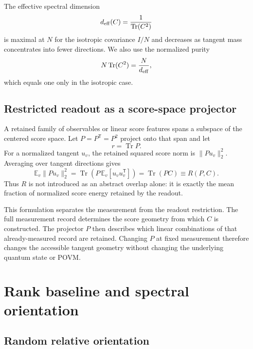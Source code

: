 \documentclass[aps,pra,reprint,superscriptaddress,nofootinbib,longbibliography]{revtex4-2}
\newcommand{\Tr}{\operatorname{Tr}}
\newcommand{\deff}{d_{\rm eff}}
\begin{document}
The effective spectral dimension
\begin{equation}
\deff(C)=\frac{1}{\Tr(C^2)}
\label{eq:deff}
\end{equation}
is maximal at $N$ for the isotropic covariance $I/N$ and decreases as tangent mass concentrates into fewer directions. We also use the normalized purity
\begin{equation}
N\Tr(C^2)=\frac{N}{\deff},
\label{eq:purity}
\end{equation}
which equals one only in the isotropic case.

\subsection{Restricted readout as a score-space projector}

A retained family of observables or linear score features spans a subspace of the centered score space. Let $P=P^{\mathsf T}=P^2$ project onto that span and let
\begin{equation}
r=\Tr P.
\end{equation}
For a normalized tangent $u_v$, the retained squared score norm is $\|Pu_v\|_2^2$. Averaging over tangent directions gives
\begin{equation}
\mathbb{E}_v\|Pu_v\|_2^2
=\Tr\!\left(P\,\mathbb{E}_v[u_vu_v^{\mathsf T}]\right)
=\Tr(PC)
\equiv R(P,C).
\label{eq:R-operational}
\end{equation}
Thus $R$ is not introduced as an abstract overlap alone: it is exactly the mean fraction of normalized score energy retained by the readout.

This formulation separates the measurement from the readout restriction. The full measurement record determines the score geometry from which $C$ is constructed. The projector $P$ then describes which linear combinations of that already-measured record are retained. Changing $P$ at fixed measurement therefore changes the accessible tangent geometry without changing the underlying quantum state or POVM.

\section{Rank baseline and spectral orientation}

\subsection{Random relative orientation}
\end{document}
